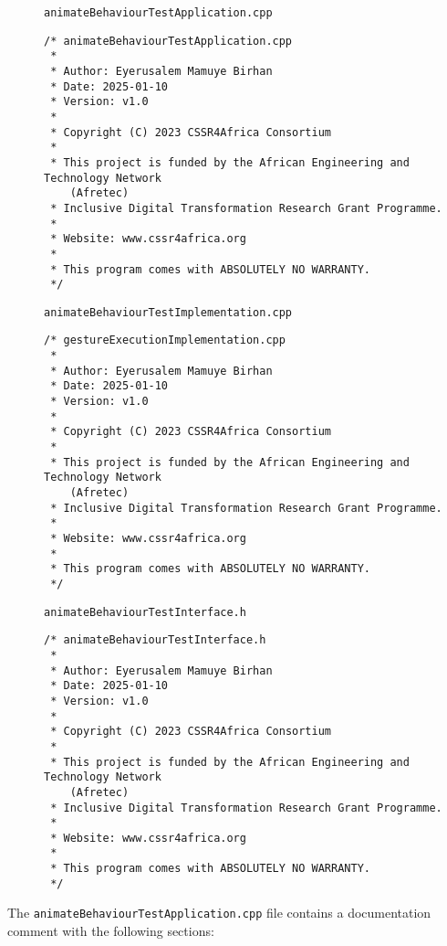 \documentclass{CSSRforAfrica}
\newcommand{\blank}{~\\}
\newcommand{\checkboxChecked}{\fbox{\ding{51}}} %
\begin{document}
\begin{description}

\item[\checkboxChecked] {\small \verb+animateBehaviourTestApplication.cpp+}  
{\small \begin{verbatim}
/* animateBehaviourTestApplication.cpp
 *
 * Author: Eyerusalem Mamuye Birhan
 * Date: 2025-01-10
 * Version: v1.0
 * 
 * Copyright (C) 2023 CSSR4Africa Consortium
 * 
 * This project is funded by the African Engineering and Technology Network 
    (Afretec) 
 * Inclusive Digital Transformation Research Grant Programme. 
 *
 * Website: www.cssr4africa.org
 *
 * This program comes with ABSOLUTELY NO WARRANTY.
 */
\end{verbatim} }

\item[\checkboxChecked]  {\small \verb+animateBehaviourTestImplementation.cpp+}  
{\small \begin{verbatim}
/* gestureExecutionImplementation.cpp
 *
 * Author: Eyerusalem Mamuye Birhan
 * Date: 2025-01-10
 * Version: v1.0
 * 
 * Copyright (C) 2023 CSSR4Africa Consortium
 * 
 * This project is funded by the African Engineering and Technology Network 
    (Afretec) 
 * Inclusive Digital Transformation Research Grant Programme. 
 *
 * Website: www.cssr4africa.org
 *
 * This program comes with ABSOLUTELY NO WARRANTY.
 */
\end{verbatim} }

\item[\checkboxChecked] {\small \verb+animateBehaviourTestInterface.h+}   
{\small \begin{verbatim}
/* animateBehaviourTestInterface.h
 *
 * Author: Eyerusalem Mamuye Birhan
 * Date: 2025-01-10
 * Version: v1.0
 * 
 * Copyright (C) 2023 CSSR4Africa Consortium
 * 
 * This project is funded by the African Engineering and Technology Network 
    (Afretec) 
 * Inclusive Digital Transformation Research Grant Programme. 
 *
 * Website: www.cssr4africa.org
 *
 * This program comes with ABSOLUTELY NO WARRANTY.
 */
\end{verbatim} }


\end{description} 
%
\noindent The {\small \verb+animateBehaviourTestApplication.cpp+} file contains a documentation comment with the following sections:
\end{document}
